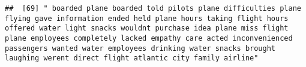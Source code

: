 \documentclass[
]{article}
\begin{document}
\begin{verbatim}
##  [69] " boarded plane boarded told pilots plane difficulties plane flying gave information ended held plane hours taking flight hours offered water light snacks wouldnt purchase idea plane miss flight plane employees completely lacked empathy care acted inconvenienced passengers wanted water employees drinking water snacks brought laughing werent direct flight atlantic city family airline"                                                                                                                                                                                                                                                                                                                                                                                                                                                                                                                                                                                                                                                                                                                                                                                                                                                                                                                                                                                                                                                                                                                                                                                                                                                                                                                                                                                              

\end{verbatim}
\end{document}
